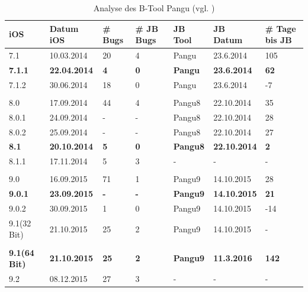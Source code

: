 \begin{table}[hp!]
    \begin{center}
        \begin{tabular}{| p{15mm} | p{20mm} | p{17mm} | p{12mm} | p{20mm} | p{22mm} | p{15mm} |} \hline
            \textbf{iOS} & \textbf{Datum iOS} & \textbf{\# Bugs} & \textbf{\# JB Bugs} & \textbf{JB Tool} & \textbf{JB Datum} & \textbf{\# Tage bis JB} \\ \hline 
7.1 & 10.03.2014 & 20 & 4 & Pangu & 23.6.2014 & 105 \\ \hline
\textbf{7.1.1} & \textbf{22.04.2014} & \textbf{4} & \textbf{0} & \textbf{Pangu} & \textbf{23.6.2014} & \textbf{62} \\ \hline
7.1.2 & 30.06.2014 & 18 & 0 & Pangu & 23.6.2014 & -7 \\ \hline
 & & & & & & \\ \hline
8.0 & 17.09.2014 & 44 & 4 & Pangu8 & 22.10.2014 & 35 \\ \hline
8.0.1 & 24.09.2014 & - & - & Pangu8 & 22.10.2014 & 28 \\ \hline
8.0.2 & 25.09.2014 & - & - & Pangu8 & 22.10.2014 & 27 \\ \hline
\textbf{8.1} & \textbf{20.10.2014} & \textbf{5} & \textbf{0} & \textbf{Pangu8} & \textbf{22.10.2014} & \textbf{2} \\ \hline
8.1.1 & 17.11.2014 & 5 & 3 & - & - & - \\ \hline
 & & & & & & \\ \hline
9.0& 16.09.2015 & 71 & 1 & Pangu9 & 14.10.2015 & 28  \\ \hline
\textbf{9.0.1} & \textbf{23.09.2015} & \textbf{-} & \textbf{-} & \textbf{Pangu9} & \textbf{14.10.2015} & \textbf{21}\\ \hline
9.0.2 & 30.09.2015 & 1 & 0 & Pangu9 & 14.10.2015 & -14 \\ \hline
9.1(32 Bit) & 21.10.2015 & 25 & 2 & Pangu9 & 14.10.2015 & -  \\ \hline
		 & & & & & & \\ \hline				
\textbf{9.1(64 Bit)} & \textbf{21.10.2015} & \textbf{25} & \textbf{2} & \textbf{Pangu9} & \textbf{11.3.2016} & \textbf{142}  \\ \hline
9.2 & 08.12.2015	 & 27 & 3 & - & - & - \\ \hline		
     \end{tabular} 
        \caption{Analyse des B-Tool Pangu (vgl. \cite{Apple[7]}) \protect\footnotemark}
        \label{tab:AnalysePangu}
    \end{center}
\end{table}


